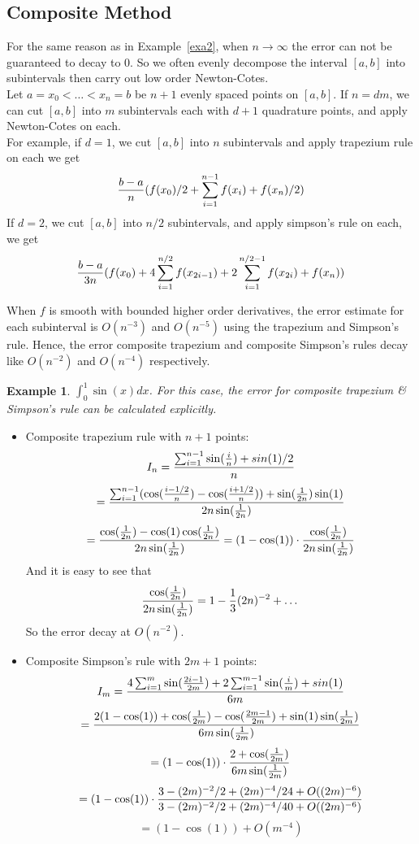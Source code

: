 \documentclass[20pt]{article} %
\theoremstyle{break}
\newtheorem{exa}[definition]{Example}
\begin{document}
\newpage

\subsection{Composite Method}

For the same reason as in Example~\ref{exa2}, when $n\rightarrow\infty$ the error can not be guaranteed to decay to $0$. So we often evenly decompose the interval $[a, b]$ into subintervals then carry out low order Newton-Cotes.\\

Let $a=x_0<\dots<x_n=b$ be $n+1$ evenly spaced points on $[a, b]$. If $n=dm$, we can cut $[a, b]$ into $m$ subintervals each with $d+1$ quadrature points, and apply Newton-Cotes on each.\\

For example, if $d=1$, we cut $[a, b]$ into $n$ subintervals and apply trapezium rule on each we get
\[{b-a\over n}(f(x_0)/2+\sum_{i=1}^{n-1}f(x_i)+f(x_n)/2)\]
If $d=2$, we cut $[a, b]$ into $n/2$ subintervals, and apply simpson's rule on each, we get
\[{b-a\over 3n}(f(x_0)+4\sum_{i=1}^{n/2}f(x_{2i-1})+2\sum_{i=1}^{n/2-1}f(x_{2i})+f(x_n))\]

\newpage


When $f$ is smooth with bounded higher order derivatives, the error estimate for each subinterval is $O(n^{-3})$ and $O(n^{-5})$ using the trapezium and Simpson's rule. Hence, the error composite trapezium and composite Simpson's rules decay like $O(n^{-2})$ and $O(n^{-4})$ respectively.


\begin{exa} $\int_0^1\sin(x)dx$. For this case, the error for composite trapezium \& Simpson's rule can be calculated explicitly. \end{exa}

\begin{itemize}
\item Composite trapezium rule with $n+1$ points:
  \[I_n={\sum_{i=1}^{n-1}\sin({i\over n})+sin(1)/2\over n}\]
  \[={\sum_{i=1}^{n-1}(\cos({i-1/2\over n})-\cos({i+1/2\over n}))+\sin({1\over 2n})\sin(1)\over 2n\sin({1\over 2n})}\]
  \[={\cos({1\over 2n})-\cos(1)\cos({1\over 2n})\over 2n\sin({1\over 2n})}=(1-\cos(1))\cdot{\cos({1\over 2n})\over 2n\sin({1\over 2n})}\]
  And it is easy to see that
  \[{\cos({1\over 2n})\over 2n\sin({1\over 2n})}=1-{1\over 3}(2n)^{-2}+\dots\]
  So the error decay at $O(n^{-2})$.

\newpage

\item Composite Simpson's rule with $2m+1$ points:
  \[I_m={4\sum_{i=1}^{m}\sin({2i-1\over 2m})+2\sum_{i=1}^{m-1}\sin({i\over m})+sin(1)\over 6m}\]
  \[={2(1-\cos(1))+\cos({1\over 2m})-\cos({2m-1\over 2m})+\sin(1)\sin({1\over 2m})\over 6m\sin({1\over 2m})}\]
  \[=(1-\cos(1))\cdot{2+\cos({1\over 2m})\over 6m\sin({1\over 2m})}\]
  \[=(1-\cos(1))\cdot{3-(2m)^{-2}/2+(2m)^{-4}/24+O((2m)^{-6})\over 3-(2m)^{-2}/2+(2m)^{-4}/40+O((2m)^{-6})}\]
  \[=(1-\cos(1))+O(m^{-4})\]
\end{itemize}
\end{document}

